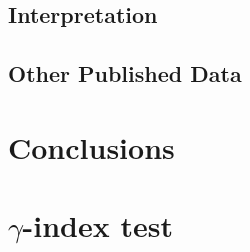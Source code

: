 \documentclass[12pt, a4paper, twoside]{book}
\begin{document}
\section{Interpretation}
\section{Other Published Data}

\chapter{Conclusions} %

\appendix
\chapter{$\gamma$-index test}

\tableofcontents
\listoffigures
\listoftables
\end{document}
